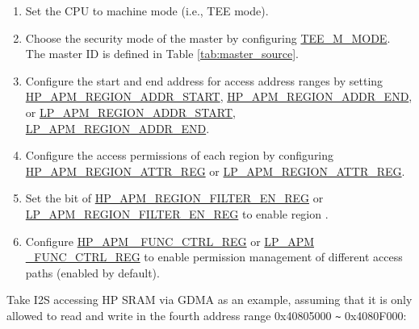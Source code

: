 \documentclass[main\_\_EN.tex]{subfiles}
\begin{document}
\begin{enumerate}

    \item Set the CPU to machine mode (i.e., TEE mode).
    \item Choose the security mode of the master by configuring \hyperref[fielddesc:TEEM0MODE]{TEE\_M\_MODE}. The master ID  is defined in Table \ref{tab:master_source}.

    \item Configure the start and end address for access address ranges by setting  \hyperref[regdesc:HPAPMREGION0ADDRSTARTREG]{HP\_APM\_REGION\_ADDR\_START}, \hyperref[regdesc:HPAPMREGION0ADDRENDREG]{HP\_APM\_REGION\_ADDR\_END}, or \hyperref[fielddesc:LPAPMREGION0ADDRSTART]{LP\_APM\_REGION\_ADDR\_START}, \hyperref[fielddesc:LPAPMREGION0ADDREND]{LP\_APM\_REGION\_ADDR\_END}.

    \item Configure the access permissions of each region by configuring \hyperref[regdesc:HPAPMREGION0ATTRREG]{HP\_APM\_REGION\_ATTR\_REG} or \hyperref[regdesc:LPAPMREGION0ATTRREG]{LP\_APM\_REGION\_ATTR\_REG}.

    \item Set the bit  of \hyperref[fielddesc:HPAPMREGIONFILTEREN]{HP\_APM\_REGION\_FILTER\_EN\_REG} or \hyperref[fielddesc:LPAPMREGIONFILTEREN]{LP\_APM\_REGION\_FILTER\_EN\_REG} to enable region .

    \item Configure \hyperref[regdesc:HPAPMFUNCCTRLREG]{HP\_APM\_ FUNC\_CTRL\_REG} or \hyperref[regdesc:LPAPMFUNCCTRLREG]{LP\_APM \_FUNC\_CTRL\_REG} to enable permission management of different access paths (enabled by default).

\end{enumerate}

Take I2S accessing HP SRAM via GDMA as an example, assuming that it is only allowed to read and write in the fourth address range 0x40805000 \verb+~+  0x4080F000:
\end{document}
